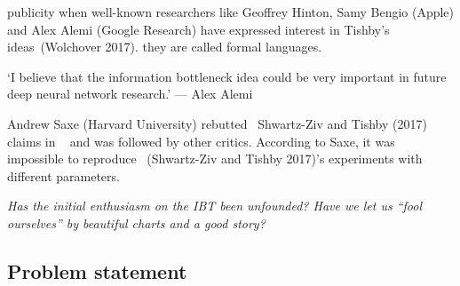 \documentclass[
  letterpaper,
  12pt,
  british]{tufte-book}
\renewenvironment{quote}{
  \list{}{\leftmargin=3.5cm\topsep=0pt}
  \item\relax\small\itshape
}
{\endlist}
\theoremstyle{plain}
\theoremstyle{definition}
\theoremstyle{plain}
\theoremstyle{remark}
\begin{document}
publicity when well-known researchers like Geoffrey Hinton, Samy
Bengio (Apple) and Alex Alemi (Google Research) have expressed interest
in Tishby's ideas~(Wolchover
2017).
they are called formal languages.

\begin{quote}
`I believe that the information bottleneck idea could be very important
in future deep neural network research.' --- Alex Alemi
\end{quote}

Andrew Saxe (Harvard University) rebutted ~Shwartz-Ziv and Tishby
(2017)
claims in ~ and was followed by other critics. According to Saxe, it was
impossible to reproduce ~(Shwartz-Ziv and Tishby
2017)'s
experiments with different parameters.

\emph{Has the initial enthusiasm on the {IBT} been unfounded? Have we
let us ``fool ourselves'' by beautiful charts and a good story?}

\hypertarget{problem-statement}{%
\subsection{Problem statement}\label{problem-statement}}
\end{document}
